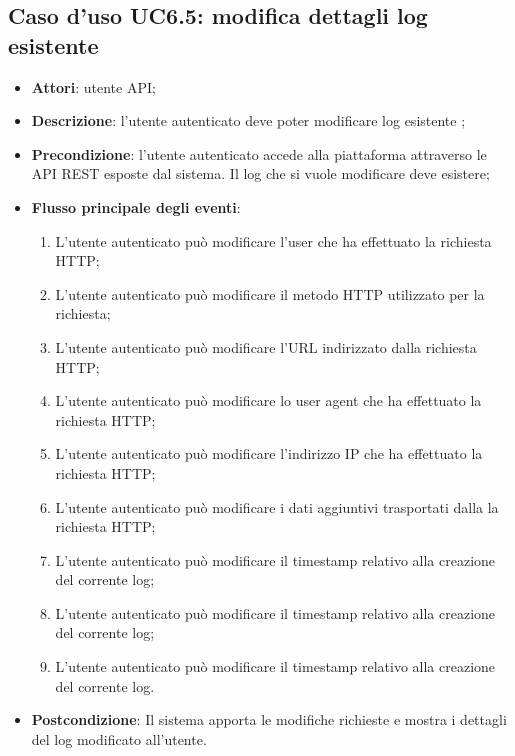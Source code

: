 \subsection{Caso d'uso UC6.5: modifica dettagli log esistente}
\begin{itemize}
\item \textbf{Attori}: utente API;
\item \textbf{Descrizione}: l'utente autenticato deve poter modificare log esistente ; 
      \item \textbf{Precondizione}: l'utente autenticato accede alla piattaforma attraverso le API REST esposte dal sistema. Il log che si vuole modificare deve esistere;

        \item \textbf{Flusso principale degli eventi}:
          \begin{enumerate}
          \item L'utente autenticato può modificare l'user che ha effettuato la richiesta HTTP;
          \item L'utente autenticato può modificare il metodo HTTP utilizzato per la richiesta;
          \item L'utente autenticato può modificare l'URL indirizzato dalla richiesta HTTP;
          \item L'utente autenticato può modificare lo user agent che ha effettuato la richiesta HTTP;
          \item L'utente autenticato può modificare l'indirizzo IP che ha effettuato la richiesta HTTP;
          \item L'utente autenticato può modificare i dati aggiuntivi trasportati dalla la richiesta HTTP;
          \item L'utente autenticato può modificare il timestamp relativo alla creazione del corrente log;
          \item L'utente autenticato può modificare il timestamp relativo alla creazione del corrente log;
          \item L'utente autenticato può modificare il timestamp relativo alla creazione del corrente log.

      \end{enumerate}
    \item \textbf{Postcondizione}: Il sistema apporta le modifiche richieste e mostra i dettagli del log modificato all'utente.
  \end{itemize}
\hypertarget{UC7}{}
